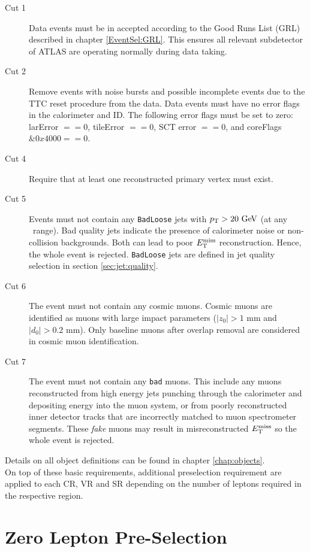 \begin{description}
\item[Cut 1] Data events must be in accepted according to the Good Runs List (GRL) described in chapter \ref{EventSel:GRL}.  This ensures all relevant subdetector of ATLAS are operating normally during data taking. 
\item[Cut 2] Remove events with noise bursts and possible incomplete events due to the TTC reset procedure from the data. Data events must have no error flags in the calorimeter and ID.  The following error flags must be set to zero: larError $== 0$, tileError $== 0$, SCT error $==0$, and coreFlags $\&0x4000 == 0$.
\item[Cut 4] Require that at least one reconstructed primary vertex must exist.
\item[Cut 5] Events must not contain any {\tt BadLoose} jets with $\pT > 20 \gev$ (at any \eta\ range). Bad quality jets indicate the presence of calorimeter noise or non-collision backgrounds. Both can lead to poor $E_{\mathrm{T}}^{\mathrm{miss}}$ reconstruction. Hence, the whole event is rejected.  {\tt BadLoose} jets are defined in jet quality selection in section \ref{sec:jet:quality}.  
\item[Cut 6] The event must not contain any cosmic muons.  Cosmic muons are identified as muons with large impact parameters  ($|z_0| > 1$ mm and $|d_0| > 0.2$ mm).  Only baseline muons after overlap removal are considered in cosmic muon identification.
\item[Cut 7] The event must not contain any {\tt bad} muons.  This include any muons reconstructed from high energy jets punching through the calorimeter and depositing energy into the muon system, or from poorly reconstructed inner detector tracks that are incorrectly matched to muon spectrometer segments. These {\it fake} muons may result in misreconstructed $E_{\mathrm{T}}^{\mathrm{miss}}$ so the whole event is rejected.
\end{description}

\indent Details on all object definitions can be found in chapter \ref{chap:objects}. \\

\indent On top of these basic requirements, additional preselection requirement are applied to each CR, VR and SR depending on the number of leptons required in the respective region.  \\

\section{Zero Lepton Pre-Selection}

